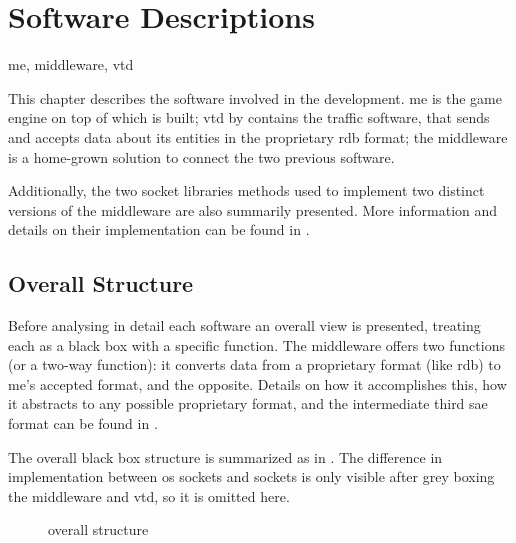 \chapter{Software Descriptions}\label{ch:software}

\begin{keywords}
	me, middleware, vtd
\end{keywords}

This chapter describes the software involved in the development. \gls{me} is the game engine on top of which  is built; \gls{vtd} by  contains the traffic software, that sends and accepts data about its entities in the proprietary \gls{rdb} format; the \gls{middleware} is a home-grown solution to connect the two previous software.

Additionally, the two socket libraries methods used to implement two distinct versions of the \gls{middleware} are also summarily presented. More information and details on their implementation can be found in .

\section{Overall Structure}\label{sc:software:overall}

Before analysing in detail each software an overall view is presented, treating each as a black box with a specific function. The \gls{middleware} offers two functions (or a two-way function): it converts data from a proprietary format (like \gls{rdb}) to \gls{me}'s accepted format, and the opposite. Details on how it accomplishes this, how it abstracts to any possible proprietary format, and the intermediate third \gls{sae} format can be found in .



The overall black box structure is summarized as in . The difference in implementation between \gls{os} sockets and  sockets is only visible after grey boxing the \gls{middleware} and \gls{vtd}, so it is omitted here.

\begin{figure}[!ht]
	\FLOATcenter{}

    \caption{overall structure}\label{im:software:structure}
\end{figure}

